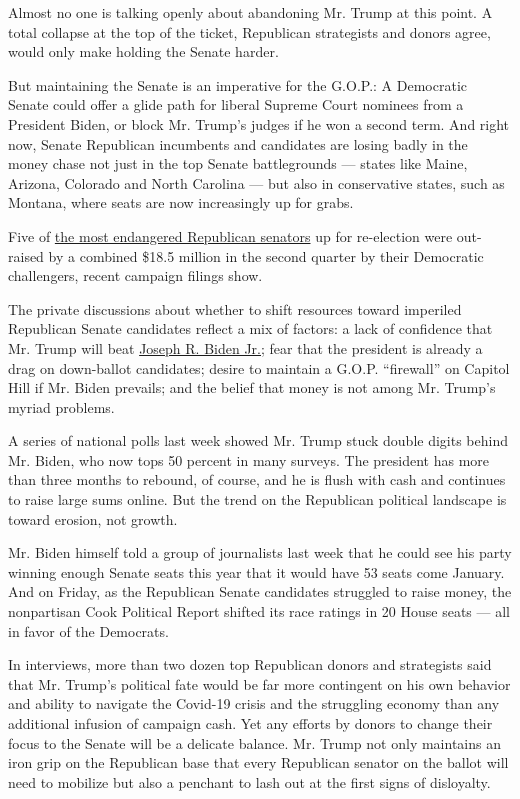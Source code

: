 Almost no one is talking openly about abandoning Mr. Trump at this
point. A total collapse at the top of the ticket, Republican strategists
and donors agree, would only make holding the Senate harder.

But maintaining the Senate is an imperative for the G.O.P.: A Democratic
Senate could offer a glide path for liberal Supreme Court nominees from
a President Biden, or block Mr. Trump's judges if he won a second term.
And right now, Senate Republican incumbents and candidates are losing
badly in the money chase not just in the top Senate battlegrounds ---
states like Maine, Arizona, Colorado and North Carolina --- but also in
conservative states, such as Montana, where seats are now increasingly
up for grabs.

Five of \href{https://cookpolitical.com/ratings/senate-race-ratings}{the
most endangered Republican senators} up for re-election were out-raised
by a combined \$18.5 million in the second quarter by their Democratic
challengers, recent campaign filings show.

The private discussions about whether to shift resources toward
imperiled Republican Senate candidates reflect a mix of factors: a lack
of confidence that Mr. Trump will beat
\href{https://www.nytimes3xbfgragh.onion/interactive/2020/us/elections/joe-biden.html}{Joseph
R. Biden Jr.}; fear that the president is already a drag on down-ballot
candidates; desire to maintain a G.O.P. ``firewall'' on Capitol Hill if
Mr. Biden prevails; and the belief that money is not among Mr. Trump's
myriad problems.

A series of national polls last week showed Mr. Trump stuck double
digits behind Mr. Biden, who now tops 50 percent in many surveys. The
president has more than three months to rebound, of course, and he is
flush with cash and continues to raise large sums online. But the trend
on the Republican political landscape is toward erosion, not growth.

Mr. Biden himself told a group of journalists last week that he could
see his party winning enough Senate seats this year that it would have
53 seats come January. And on Friday, as the Republican Senate
candidates struggled to raise money, the nonpartisan Cook Political
Report shifted its race ratings in 20 House seats --- all in favor of
the Democrats.

In interviews, more than two dozen top Republican donors and strategists
said that Mr. Trump's political fate would be far more contingent on his
own behavior and ability to navigate the Covid-19 crisis and the
struggling economy than any additional infusion of campaign cash. Yet
any efforts by donors to change their focus to the Senate will be a
delicate balance. Mr. Trump not only maintains an iron grip on the
Republican base that every Republican senator on the ballot will need to
mobilize but also a penchant to lash out at the first signs of
disloyalty.

